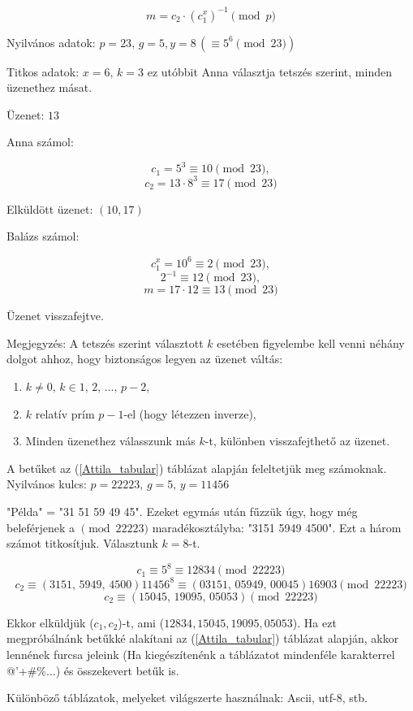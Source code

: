 \[
m=c_{2}\cdot(c_{1}^{x})^{-1}\pmod p
\]


\begin{example}
Nyilvános adatok: $p=23,\,g=5,y=8\,(\equiv5^{6}\pmod{23})$

Titkos adatok: $x=6,\,k=3$ ez utóbbit Anna választja tetszés szerint,
minden üzenethez másat.

Üzenet: $13$

Anna számol:

\[
c_{1}=5^{3}\equiv10\pmod{23},
\]
\[
c_{2}=13\cdot8^{3}\equiv17\pmod{23}
\]

Elküldött üzenet: $(10,17)$

Balázs számol:

\[
c_{1}^{x}=10^{6}\equiv2\pmod{23},
\]
\[
2^{-1}\equiv12\pmod{23},
\]
\[
m=17\cdot12\equiv13\pmod{23}
\]

Üzenet visszafejtve.
\end{example}
Megjegyzés: A tetszés szerint választott $k$ esetében figyelembe
kell venni néhány dolgot ahhoz, hogy biztonságos legyen az üzenet
váltás: 
\begin{enumerate}
\item $k\neq0,\,k\in{1,\,2,\,\dots,\,p-2}$, 
\item $k$ relatív prím $p-1$-el (hogy létezzen inverze), 
\item Minden üzenethez válasszunk más $k$-t, különben visszafejthető az
üzenet. 
\end{enumerate}

\begin{example}
A betűket az (\ref{Attila_tabular}) táblázat alapján feleltetjük
meg számoknak. Nyilvános kulcs: $p=22223,\,g=5,\,y=11456$

"Példa" = "31 51 59 49 45". Ezeket egymás után fűzzük úgy, hogy
még beleférjenek a $\pmod{22223}$ maradékosztályba: "3151 5949 4500".
Ezt a három számot titkosítjuk. Választunk $k=8$-t.

\[
c_{1}\equiv5^{8}\equiv12834\pmod{22223}
\]
\[
c_{2}\equiv(3151,\,5949,\,4500)11456^{8}\equiv(03151,\,05949,\,00045)16903\pmod{22223}
\]
\[
c_{2}\equiv(15045,\,19095,\,05053)\pmod{22223}
\]

Ekkor elküldjük ($c_{1},c_{2}$)-t, ami ($12834,15045,19095,05053$).
Ha ezt megpróbálnánk betűkké alakítani az (\ref{Attila_tabular})
táblázat alapján, akkor lennének furcsa jeleink (Ha kiegészítenénk
a táblázatot mindenféle karakterrel @'+\#\%...) és összekevert betűk
is.
\end{example}

Különböző táblázatok, melyeket világszerte használnak: Ascii, utf-8, stb.

